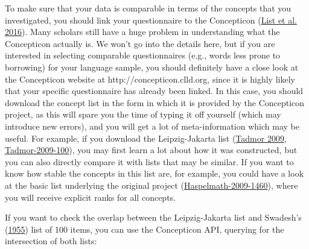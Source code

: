 \documentclass[a4paper,svgnames]{scrartcl}
\begin{document}
To make sure that your data is comparable in terms of the concepts that
you investigated, you should link your questionnaire to the Concepticon
(\href{http://bibliography.lingpy.org?key=List2016a}{List et al. 2016}).
Many scholars still have a huge problem in understanding what the
Concepticon actually is. We won't go into the details here, but if you
are interested in selecting comparable questionnaires (e.g., words less
prone to borrowing) for your language sample, you should definitely have
a close look at the Concepticon website at http://concepticon.clld.org,
since it is highly likely that your specific questionnaire has already
been linked. In this case, you should download the concept list in the
form in which it is provided by the Concepticon project, as this will
spare you the time of typing it off yourself (which may introduce new
errors), and you will get a lot of meta-information which may be useful.
For example, if you download the Leipzig-Jakarta list
(\href{http://bibliography.lingpy.org?key=Tadmor2009}{Tadmor 2009},
\href{http://concepticon.clld.org/contributions/Tadmor-2009-100}{Tadmor-2009-100}),
you may first learn a lot about how it was constructed, but you can also
directly compare it with lists that may be similar. If you want to know
how stable the concepts in this list are, for example, you could have a
look at the basic list underlying the original project
(\href{http://concepticon.clld.org/contributions/Haspelmath-2009-1460}{Haspelmath-2009-1460}),
where you will receive explicit ranks for all concepts.

If you want to check the overlap between the Leipzig-Jakarta list and
Swadesh's (\href{http://bibliography.lingpy.org?key=Swadesh1955}{1955})
list of 100 items, you can use the Concepticon API, querying for the
intersection of both lists:
\end{document}

